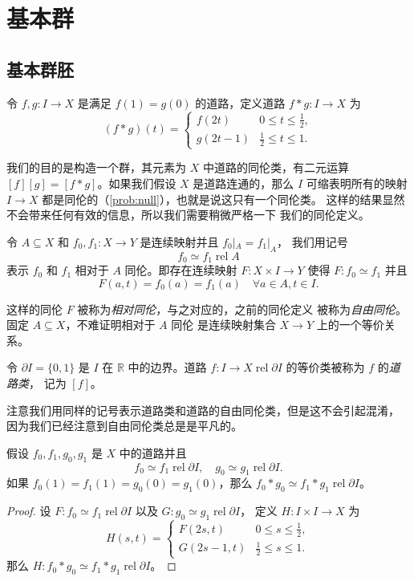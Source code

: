 \documentclass[fontset=none]{Notes}
\DeclareMathOperator\rel{rel}
\newcommand{\partI}{\partial I}
\newcommand{\relhomo}{\rel\partI}
\begin{document}
\chapter{基本群}

\section{基本群胚}

\begin{definition}
  令 $f,g:I\to X$ 是满足 $f(1)=g(0)$ 的道路，定义道路 $f*g:I\to X$
  为
  \[
    (f*g)(t)=\begin{cases}
      f(2t) & 0\leq t\leq\frac{1}{2},\\
      g(2t-1) & \frac{1}{2}\leq t\leq 1.
    \end{cases}
  \]
\end{definition}

我们的目的是构造一个群，其元素为 $X$ 中道路的同伦类，有二元运算
$[f][g]=[f*g]$。如果我们假设 $X$ 是道路连通的，那么 $I$ 可缩表明所有的映射
$I\to X$ 都是同伦的（\ref{prob:null}），也就是说这只有一个同伦类。
这样的结果显然不会带来任何有效的信息，所以我们需要稍微严格一下
我们的同伦定义。

\begin{definition}
  令 $A\subseteq X$ 和 $f_0,f_1:X\to Y$ 是连续映射并且 $f_0|_A=f_1|_A$，
  我们用记号
  \[
    f_0\simeq f_1\rel A
  \]
  表示 $f_0$ 和 $f_1$ 相对于 $A$ 同伦。即存在连续映射
  $F:X\times I\to Y$ 使得 $F:f_0\simeq f_1$ 并且
  \[
    F(a,t)=f_0(a)=f_1(a)\quad \forall a\in A,t\in I.
  \] 
\end{definition}

这样的同伦 $F$ 被称为\emph{相对同伦}，与之对应的，之前的同伦定义
被称为\emph{自由同伦}。固定 $A\subseteq X$，不难证明相对于 $A$ 同伦
是连续映射集合 $X\to Y$ 上的一个等价关系。

\begin{definition}
  令 $\partI=\{0,1\}$ 是 $I$ 在 $\mathbb{R}$ 中的边界。道路
  $f:I\to X\rel\partI$ 的等价类被称为 $f$ 的\emph{道路类}，
  记为 $[f]$。
\end{definition}

注意我们用同样的记号表示道路类和道路的自由同伦类，但是这不会引起混淆，
因为我们已经注意到自由同伦类总是是平凡的。

\begin{theorem}
  假设 $f_0,f_1,g_0,g_1$ 是 $X$ 中的道路并且
  \[
    f_0\simeq f_1\relhomo,\quad g_0\simeq g_1\relhomo.
  \]
  如果 $f_0(1)=f_1(1)=g_0(0)=g_1(0)$，那么 $f_0*g_0\simeq f_1*g_1\relhomo$。
\end{theorem}
\begin{proof}
  设 $F:f_0\simeq f_1\relhomo$ 以及 $G:g_0\simeq g_1\relhomo$，
  定义 $H:I\times I\to X$ 为
  \[
    H(s,t)=\begin{cases}
      F(2s,t) & 0\leq s\leq \frac{1}{2},\\
      G(2s-1,t) & \frac{1}{2}\leq s\leq 1.
    \end{cases}
  \]
  那么 $H:f_0*g_0\simeq f_1*g_1\relhomo$。
\end{proof}
\end{document}
